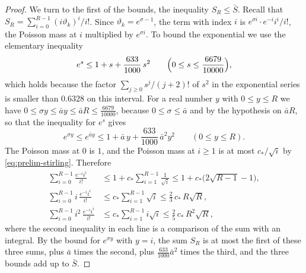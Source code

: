 \documentclass{amsart}
\theoremstyle{definition}
\theoremstyle{remark}
\numberwithin{equation}{section}
\begin{document}
\begin{proof}
We turn to the first of the bounds, the inequality $S_R\le\bar S$. Recall that $S_R=\sum_{i=0}^{R-1}(i\vartheta_k)^i/i!$. Since $\vartheta_k=e^{\sigma-1}$, the term with index $i$ is $e^{\sigma i}\cdot e^{-i}i^i/i!$, the Poisson mass at $i$ multiplied by $e^{\sigma i}$. To bound the exponential we use the elementary inequality
\[
e^s\le 1+s+\frac{633}{1000}\,s^2\qquad\Bigl(0\le s\le\frac{6679}{10000}\Bigr),
\]
which holds because the factor $\sum_{j\ge 0}s^j/(j+2)!$ of $s^2$ in the exponential series is smaller than $0.6328$ on this interval. For a real number $y$ with $0\le y\le R$ we have $0\le\sigma y\le\bar ay\le\bar aR\le\frac{6679}{10000}$, because $0\le\sigma\le\bar a$ and by the hypothesis on $\bar aR$, so that the inequality for $e^s$ gives
\begin{equation}\label{eq:strip-quad}
e^{\sigma y}\le e^{\bar ay}\le 1+\bar a\,y+\frac{633}{1000}\,\bar a^{2}y^{2}\qquad(0\le y\le R).
\end{equation}
The Poisson mass at $0$ is $1$, and the Poisson mass at $i\ge 1$ is at most $c_\ast/\sqrt i$ by \eqref{eq:prelim-stirling}. Therefore
\begin{equation}\label{eq:strip-poisson}
\begin{aligned}
\sum_{i=0}^{R-1}\frac{e^{-i}i^i}{i!}&\le 1+c_\ast\sum_{i=1}^{R-1}\frac{1}{\sqrt i}\le 1+c_\ast\bigl(2\sqrt{R-1}-1\bigr),\\
\sum_{i=0}^{R-1}i\,\frac{e^{-i}i^i}{i!}&\le c_\ast\sum_{i=1}^{R-1}\sqrt i\le\frac23\,c_\ast\,R\sqrt R,\\
\sum_{i=0}^{R-1}i^2\,\frac{e^{-i}i^i}{i!}&\le c_\ast\sum_{i=1}^{R-1}i\sqrt i\le\frac25\,c_\ast\,R^2\sqrt R,
\end{aligned}
\end{equation}
where the second inequality in each line is a comparison of the sum with an integral. By the bound for $e^{\sigma y}$ with $y=i$, the sum $S_R$ is at most the first of these three sums, plus $\bar a$ times the second, plus $\frac{633}{1000}\bar a^2$ times the third, and the three bounds add up to $\bar S$.


\end{proof}
\end{document}
